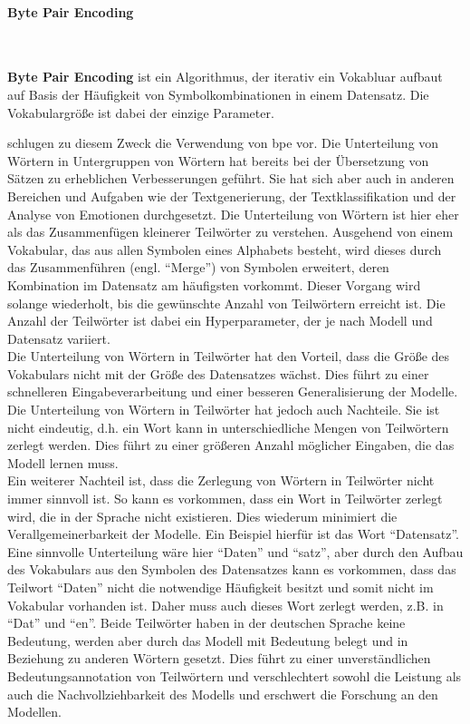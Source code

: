 \paragraph{Byte Pair Encoding}\mbox{} \\
\begin{definition}\label{def:bpe}
    \textbf{Byte Pair Encoding} ist ein Algorithmus, der iterativ ein Vokabluar aufbaut auf Basis der Häufigkeit von Symbolkombinationen in einem Datensatz.
    Die Vokabulargröße ist dabei der einzige Parameter.
\end{definition}
\citet{bpe} schlugen zu diesem Zweck die Verwendung von \ac{bpe} vor.
Die Unterteilung von Wörtern in Untergruppen von Wörtern hat bereits bei der Übersetzung von Sätzen zu erheblichen Verbesserungen geführt.
Sie hat sich aber auch in anderen Bereichen und Aufgaben wie der Textgenerierung, der Textklassifikation und der Analyse von Emotionen durchgesetzt.
Die Unterteilung von Wörtern ist hier eher als das Zusammenfügen kleinerer Teilwörter zu verstehen.
Ausgehend von einem Vokabular, das aus allen Symbolen eines Alphabets besteht, wird dieses durch das Zusammenführen (engl. \enquote{Merge}) von Symbolen erweitert, deren Kombination im Datensatz am häufigsten vorkommt.
Dieser Vorgang wird solange wiederholt, bis die gewünschte Anzahl von Teilwörtern erreicht ist.
Die Anzahl der Teilwörter ist dabei ein Hyperparameter, der je nach Modell und Datensatz variiert.\\

Die Unterteilung von Wörtern in Teilwörter hat den Vorteil, dass die Größe des Vokabulars nicht mit der Größe des Datensatzes wächst.
Dies führt zu einer schnelleren Eingabeverarbeitung und einer besseren Generalisierung der Modelle.
Die Unterteilung von Wörtern in Teilwörter hat jedoch auch Nachteile.
Sie ist nicht eindeutig, d.h. ein Wort kann in unterschiedliche Mengen von Teilwörtern zerlegt werden.
Dies führt zu einer größeren Anzahl möglicher Eingaben, die das Modell lernen muss.\\

Ein weiterer Nachteil ist, dass die Zerlegung von Wörtern in Teilwörter nicht immer sinnvoll ist.
So kann es vorkommen, dass ein Wort in Teilwörter zerlegt wird, die in der Sprache nicht existieren.
Dies wiederum minimiert die Verallgemeinerbarkeit der Modelle.
Ein Beispiel hierfür ist das Wort \enquote{Datensatz}.
Eine sinnvolle Unterteilung wäre hier \enquote{Daten} und \enquote{satz}, aber durch den Aufbau des Vokabulars aus den Symbolen des Datensatzes kann es vorkommen, dass das Teilwort \enquote{Daten} nicht die notwendige Häufigkeit besitzt und somit nicht im Vokabular vorhanden ist.
Daher muss auch dieses Wort zerlegt werden, z.B. in \enquote{Dat} und \enquote{en}.
Beide Teilwörter haben in der deutschen Sprache keine Bedeutung, werden aber durch das Modell mit Bedeutung belegt und in Beziehung zu anderen Wörtern gesetzt.
Dies führt zu einer unverständlichen Bedeutungsannotation von Teilwörtern und verschlechtert sowohl die Leistung als auch die Nachvollziehbarkeit des Modells und erschwert die Forschung an den Modellen.

